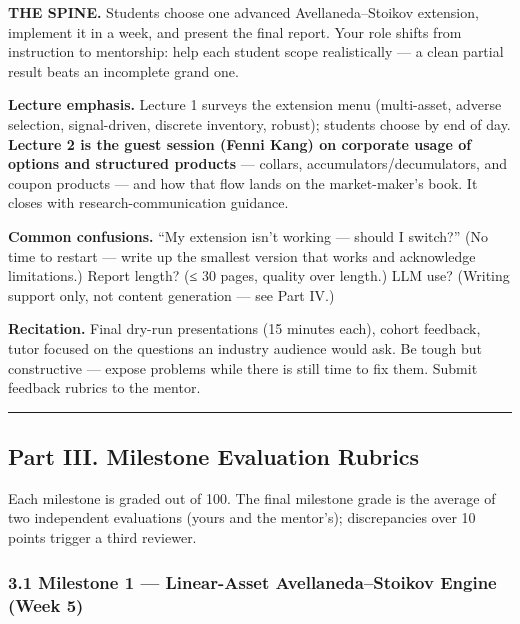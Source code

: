 \documentclass[
]{article}
\begin{document}
\textbf{THE SPINE.} Students choose one advanced Avellaneda--Stoikov
extension, implement it in a week, and present the final report. Your
role shifts from instruction to mentorship: help each student scope
realistically --- a clean partial result beats an incomplete grand one.

\textbf{Lecture emphasis.} Lecture 1 surveys the extension menu
(multi-asset, adverse selection, signal-driven, discrete inventory,
robust); students choose by end of day. \textbf{Lecture 2 is the guest
session (Fenni Kang) on corporate usage of options and structured
products} --- collars, accumulators/decumulators, and coupon products
--- and how that flow lands on the market-maker's book. It closes with
research-communication guidance.

\textbf{Common confusions.} ``My extension isn't working --- should I
switch?'' (No time to restart --- write up the smallest version that
works and acknowledge limitations.) Report length? (≤ 30 pages, quality
over length.) LLM use? (Writing support only, not content generation ---
see Part IV.)

\textbf{Recitation.} Final dry-run presentations (15 minutes each),
cohort feedback, tutor focused on the questions an industry audience
would ask. Be tough but constructive --- expose problems while there is
still time to fix them. Submit feedback rubrics to the mentor.

\begin{center}\rule{0.5\linewidth}{0.5pt}\end{center}

\subsection{Part III. Milestone Evaluation
Rubrics}\label{part-iii.-milestone-evaluation-rubrics}

Each milestone is graded out of 100. The final milestone grade is the
average of two independent evaluations (yours and the mentor's);
discrepancies over 10 points trigger a third reviewer.

\subsubsection{3.1 Milestone 1 --- Linear-Asset Avellaneda--Stoikov
Engine (Week
5)}\label{milestone-1-linear-asset-avellanedastoikov-engine-week-5}
\end{document}
